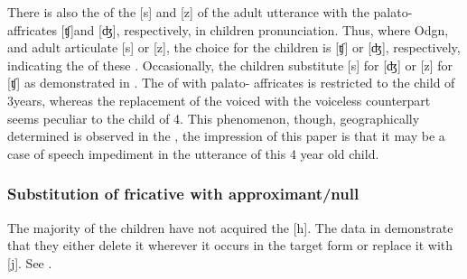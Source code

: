 \documentclass[output=paper,
modfonts
]{langscibook}
\begin{document}
There is also the  of the   [s] and [z] of the adult utterance with the palato- affricates [ʧ]and [ʤ], respectively, in children pronunciation. Thus, where Odgn,  and  adult articulate [s] or [z], the choice for the children is [ʧ] or [ʤ], respectively, indicating the  of these . Occasionally, the children substitute [s] for [ʤ] or [z] for [ʧ] as demonstrated in . The  of   with palato- affricates is restricted to the child of 3years, whereas the replacement of the voiced   with the voiceless counterpart seems peculiar to the child of 4. This phenomenon, though, geographically determined is observed in the , the impression of this paper is that it may be a case of speech impediment in the utterance of this 4 year old child.



  
\subsubsection{Substitution of fricative with approximant/null}\label{sec:alerechi:1.7.6}

The majority of the children have not acquired the   [h]. The data in  demonstrate that they either delete it wherever it occurs in the target form or replace it with [j]. See .

\begin{table}
\caption{h → j, h →${\emptyset}$.}
\label{tab:alerechi:14}
\end{table}
\end{document}
